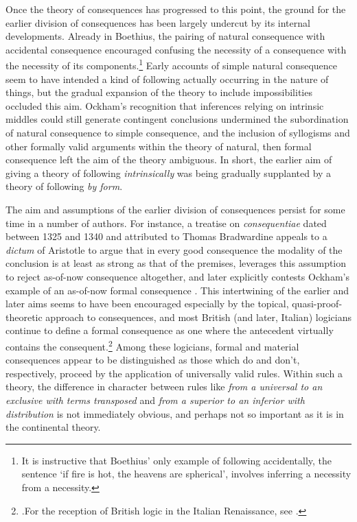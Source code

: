 \documentclass[]{article}
\begin{document}
Once the theory of consequences has progressed to this point, the ground for the earlier division of consequences has been largely undercut by its internal developments. Already in Boethius, the pairing of natural consequence with accidental consequence encouraged confusing the necessity of a consequence with the necessity of its components.\footnote{It is instructive that Boethius' only example of following accidentally, the sentence `if fire is hot, the heavens are spherical', involves inferring a necessity from a necessity.} Early accounts of simple natural consequence seem to have intended a kind of following actually occurring in the nature of things, but the gradual expansion of the theory to include impossibilities occluded this aim. Ockham's recognition that inferences relying on intrinsic middles could still generate contingent conclusions undermined the subordination of natural consequence to simple consequence, and the inclusion of syllogisms and other formally valid arguments within the theory of natural, then formal consequence left the aim of the theory ambiguous. In short, the earlier aim of giving a theory of following \textit{intrinsically} was being gradually supplanted by a theory of following \textit{by form}.

The aim and assumptions of the earlier division of consequences persist for some time in a number of authors. For instance, a treatise on \textit{consequentiae} dated between 1325 and 1340 and attributed to Thomas Bradwardine appeals to a \textit{dictum} of Aristotle to argue that in every good consequence the modality of the conclusion is at least as strong as that of the premises, leverages this assumption to reject as-of-now consequence altogether, and later explicitly contests Ockham's example of an as-of-now formal consequence \autocite[A.II, par. 4-6, pp. 92-93;  A.III, par. 16-17, p. 95]{Green-Pedersen1982}. This intertwining of the earlier and later aims seems to have been encouraged especially by the topical, quasi-proof-theoretic approach to consequences, and most British (and later, Italian) logicians continue to define a formal consequence as one where the antecedent virtually contains the consequent.\footnote{\autocite[476]{DutilhNovaes2008}.For the reception of British logic in the Italian Renaissance, see \autocite{Maieru1982}.} Among these logicians, formal and material consequences appear to be distinguished as those which do and don't, respectively, proceed by the application of universally valid rules. Within such a theory, the difference in character between rules like \textit{from a universal to an exclusive with terms transposed} and \textit{from a superior to an inferior with distribution} is not immediately obvious, and perhaps not so important as it is in the continental theory.
\end{document}
